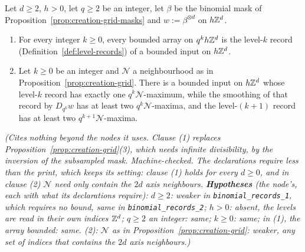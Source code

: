 \begin{proposition}
\label{prop:binomial-records}
\leanok
{}
Let $d \ge 2$, $h > 0$, let $q \ge 2$ be an integer, let $\beta$ be the binomial mask of
Proposition~\ref{prop:creation-grid-masks} and $w := \beta^{\otimes d}$ on $h\mathbb{Z}^d$.
\begin{enumerate}
\item For every integer $k \ge 0$, every bounded array on $q^kh\mathbb{Z}^d$ is the level-$k$ record
(Definition~\ref{def:level-records}) of a bounded input on $h\mathbb{Z}^d$.
\item Let $k \ge 0$ be an integer and $\mathcal{N}$ a neighbourhood as in
Proposition~\ref{prop:creation-grid}. There is a bounded input on $h\mathbb{Z}^d$ whose level-$k$ record
has exactly one $q^k\mathcal{N}$-maximum, while the smoothing of that record by $D_{q^k}w$ has at
least two $q^k\mathcal{N}$-maxima, and the level-$(k+1)$ record has at least two
$q^{k+1}\mathcal{N}$-maxima.
\end{enumerate}
\statusT\quad\emph{(Cites nothing beyond the nodes it uses. Clause (1) replaces
Proposition~\ref{prop:creation-grid}(3), which needs infinite divisibility, by the inversion of the
subsampled mask. Machine-checked. The declarations require less than the print, which keeps its
setting: clause (1) holds for every $d \ge 0$, and in clause (2) $\mathcal{N}$ need only contain
the $2d$ axis neighbours.
\textbf{Hypotheses} (the node's, each with what its declarations require): $d \ge 2$: weaker in
\texttt{binomial\_records\_1}, which requires no bound, same in \texttt{binomial\_records\_2}; $h > 0$:
absent, the levels are read in their own indices $\mathbb{Z}^d$; $q \ge 2$ an integer: same; $k \ge 0$:
same; in (1), the array bounded: same. (2): $\mathcal{N}$ as in
Proposition~\ref{prop:creation-grid}: weaker, any set of indices that contains the $2d$ axis
neighbours.)}
\end{proposition}

